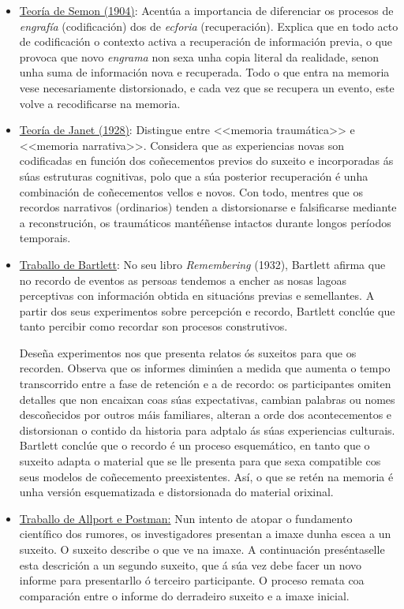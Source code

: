 \documentclass[a4paper,11pt]{article}
\begin{document}
\begin{itemize}
	\item \underline{Teoría de Semon (1904)}: Acentúa a importancia de diferenciar os procesos de
	\textit{engrafía} (codificación) dos de \textit{ecforia} (recuperación). Explica que en todo 
	acto de codificación o contexto activa a recuperación de información previa, o que provoca que 
	novo \textit{engrama} non sexa unha copia literal da realidade, senon unha suma de información 
	nova e recuperada. Todo o que entra na memoria vese necesariamente distorsionado, e cada vez que 
	se recupera un evento, este volve a recodificarse na memoria.
	\item \underline{Teoría de Janet (1928)}: Distingue entre <<memoria traumática>> e <<memoria
	narrativa>>. Considera que as experiencias novas son codificadas en función dos coñecementos
	previos do suxeito e incorporadas ás súas estruturas cognitivas, polo que a súa posterior
	recuperación é unha combinación de coñecementos vellos e novos. Con todo, mentres que os 
	recordos narrativos (ordinarios) tenden a distorsionarse e falsificarse mediante a 
	reconstrución, os traumáticos mantéñense intactos durante longos períodos temporais. 
	\item \underline{Traballo de Bartlett}: No seu libro \textit{Remembering} (1932), Bartlett 
	afirma que no recordo de eventos as persoas tendemos a encher as nosas lagoas perceptivas con 			información obtida en situacións previas e semellantes. A partir dos seus experimentos sobre
	percepción e recordo, Bartlett conclúe que tanto percibir como recordar son procesos 
	construtivos.
	
	Deseña experimentos nos que presenta relatos ós suxeitos para que os recorden. Observa que os
	informes diminúen a medida que aumenta o tempo transcorrido entre a fase de retención e a de 
	recordo: os participantes omiten detalles que non encaixan coas súas expectativas, cambian
	palabras ou nomes descoñecidos por outros máis familiares, alteran a orde dos acontecementos e
	distorsionan o contido da historia para adptalo ás súas experiencias culturais. Bartlett conclúe 
	que o recordo é un proceso esquemático, en tanto que o suxeito adapta o material que se lle 
	presenta para que sexa compatible cos seus modelos de coñecemento preexistentes. Así, o que se 
	retén na memoria é unha versión esquematizada e distorsionada do material orixinal.
	\item \underline{Traballo de Allport e Postman:} Nun intento de atopar o fundamento científico
	dos rumores, os investigadores presentan a imaxe dunha escea a un suxeito. O suxeito describe o
	que ve na imaxe. A continuación preséntaselle esta descrición a un segundo suxeito, que á súa 
	vez debe facer un novo informe para presentarllo ó terceiro participante. O proceso remata coa
	comparación entre o informe do derradeiro suxeito e a imaxe inicial.
	

\end{itemize}
\end{document}
